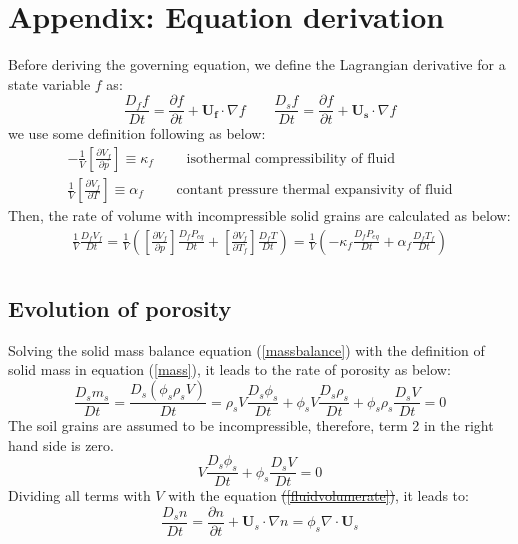 \documentclass[preprint,12pt]{elsarticle}
\providecommand{\DIFadd}[1]{{\protect\color{blue}\uwave{#1}}} %
\providecommand{\DIFdel}[1]{{\protect\color{red}\sout{#1}}}                      %
\providecommand{\DIFaddbegin}{} %
\providecommand{\DIFaddend}{} %
\providecommand{\DIFdelbegin}{} %
\providecommand{\DIFdelend}{} %
\newcommand{\DIFscaledelfig}{0.5}
\newlength{\DIFdelgraphicswidth} %
\newlength{\DIFdelgraphicsheight} %
\newcommand{\DIFaddincludegraphics}[2][]{{\color{blue}\fbox{\DIFOincludegraphics[#1]{#2}}}} %
\newcommand{\DIFdelincludegraphics}[2][]{%
\sbox{\DIFdelgraphicsbox}{\DIFOincludegraphics[#1]{#2}}%
\settoboxwidth{\DIFdelgraphicswidth}{\DIFdelgraphicsbox} %
\settoboxtotalheight{\DIFdelgraphicsheight}{\DIFdelgraphicsbox} %
\scalebox{\DIFscaledelfig}{%
\parbox[b]{\DIFdelgraphicswidth}{\usebox{\DIFdelgraphicsbox}\\[-\baselineskip] \rule{\DIFdelgraphicswidth}{0em}}\llap{\resizebox{\DIFdelgraphicswidth}{\DIFdelgraphicsheight}{%
\setlength{\unitlength}{\DIFdelgraphicswidth}%
\begin{picture}(1,1)%
\thicklines\linethickness{2pt} %
{\color[rgb]{1,0,0}\put(0,0){\framebox(1,1){}}}%
{\color[rgb]{1,0,0}\put(0,0){\line( 1,1){1}}}%
{\color[rgb]{1,0,0}\put(0,1){\line(1,-1){1}}}%
\end{picture}%
}\hspace*{3pt}}} %
} %
\DeclareRobustCommand{\DIFaddbegin}{\DIFOaddbegin \let\includegraphics\DIFaddincludegraphics} %
\DeclareRobustCommand{\DIFaddend}{\DIFOaddend \let\includegraphics\DIFOincludegraphics} %
\DeclareRobustCommand{\DIFdelbegin}{\DIFOdelbegin \let\includegraphics\DIFdelincludegraphics} %
\DeclareRobustCommand{\DIFdelend}{\DIFOaddend \let\includegraphics\DIFOincludegraphics} %
\begin{document}

\section{\textsf{Appendix: Equation derivation}}
%
%
Before deriving the governing equation, we define the Lagrangian derivative for a state variable $f$ as:
%
%
\begin{equation}
\frac{D_f f}{Dt} =  \frac{\partial f}{\partial t} + \pmb{U_f} \cdot \nabla f \qquad
\frac{D_s f}{Dt} =  \frac{\partial f}{\partial t} + \pmb{U_s} \cdot \nabla f
\end {equation}
%
%
we use some definition following \cite{Kashiwa} as below:
%
%
\begin{gather}
-\frac{1}{V} \left[ \frac{\partial V_f}{\partial p} \right] \equiv \kappa_f \qquad \mbox{ isothermal compressibility of fluid} \\
\frac{1}{V} \left[ \frac{\partial V_f}{\partial T} \right] \equiv \alpha_f \qquad \mbox{ contant pressure thermal expansivity of fluid}
\end {gather}
%
%
Then, the rate of volume with incompressible solid grains are calculated as below:
%
%
\begin{equation}
\label{fluidvolumerate}
\begin{gathered}
   \frac{1}{V} \frac{D_f V_f}{Dt} = \frac{1}{V} \left( \left[ \frac{\partial V_f}{\partial p} \right] \frac{D_f P_{eq}}{D t} + \left[ \frac{\partial V_f}{\partial T_f} \right] \frac{D_f T}{D t} \right) = \frac{1}{V} \left( -\kappa_f \frac{D_f P_{eq}}{D t} + \alpha_f \frac{D_f T_f}{D t} \right) \\
\end {gathered}
\end {equation}
%
%
\subsection{\textsf{Evolution of porosity}}
%
%
Solving the solid mass balance equation (\ref{massbalance}) with the definition of solid mass in equation (\ref{mass}), it leads to the rate of porosity as below:
%
%
\begin{equation}
   \frac{D_sm_s}{Dt} = \frac{D_s(\phi_s \rho_s V)}{Dt} = \rho_s V \frac{D_s \phi_s}{Dt} + \phi_s V \frac{D_s \rho_s}{Dt} + \phi_s \rho_s  \frac{D_s V}{Dt} = 0  
\end {equation}
%
%
The soil grains are assumed to be incompressible, therefore, term 2 in the right hand side is zero. 
%
%
\begin{equation}
  V \frac{D_s \phi_s}{Dt} + \phi_s \frac{D_s V}{Dt} = 0  
\end {equation}
%
%
Dividing all terms with $V$ with the equation \DIFdelbegin \DIFdel{(\ref{fluidvolumerate})}\DIFdelend \DIFaddbegin \DIFadd{$\frac{1}{V} \frac{D_s V}{Dt} = \nabla \cdot \pmb{U}_s $}\DIFaddend , it leads to:
%
%
\begin{equation}
  \frac{D_s n}{Dt} = \frac{\partial n}{\partial t} + \pmb{U}_s \cdot \nabla n = 
  \phi_s \nabla \cdot \pmb{U}_s  
\end {equation}
%
%
\end{document}
